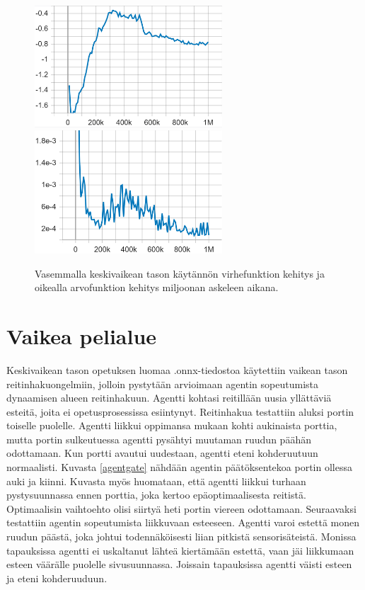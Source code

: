 \documentclass[utf8]{gradu3}
\begin{document}
\begin{figure}[h]
\includegraphics[width=7cm]{I_Policy_Loss.png}
\includegraphics[width=7cm]{I_Value_Loss.png}
\caption{Vasemmalla keskivaikean tason käytännön virhefunktion kehitys ja oikealla arvofunktion kehitys miljoonan askeleen aikana.}
\label{intermediateloss}
\end{figure}

\section{Vaikea pelialue}
\label{vaikea}

Keskivaikean tason opetuksen luomaa .onnx-tiedostoa käytettiin vaikean tason reitinhakuongelmiin, jolloin pystytään arvioimaan agentin sopeutumista dynaamisen alueen reitinhakuun. Agentti kohtasi reitillään uusia yllättäviä esteitä, joita ei opetusprosessissa esiintynyt. Reitinhakua testattiin aluksi portin toiselle puolelle. Agentti liikkui oppimansa mukaan kohti aukinaista porttia, mutta portin sulkeutuessa agentti pysähtyi muutaman ruudun päähän odottamaan. Kun portti avautui uudestaan, agentti eteni kohderuutuun normaalisti. Kuvasta \ref{agentgate} nähdään agentin päätöksentekoa portin ollessa auki ja kiinni. Kuvasta myös huomataan, että agentti liikkui turhaan pystysuunnassa ennen porttia, joka kertoo epäoptimaalisesta reitistä. Optimaalisin vaihtoehto olisi siirtyä heti portin viereen odottamaan. Seuraavaksi testattiin agentin sopeutumista liikkuvaan esteeseen. Agentti varoi estettä monen ruudun päästä, joka johtui todennäköisesti liian pitkistä sensorisäteistä. Monissa tapauksissa agentti ei uskaltanut lähteä kiertämään estettä, vaan jäi liikkumaan esteen väärälle puolelle sivusuunnassa. Joissain tapauksissa agentti väisti esteen ja eteni kohderuuduun.
\end{document}

